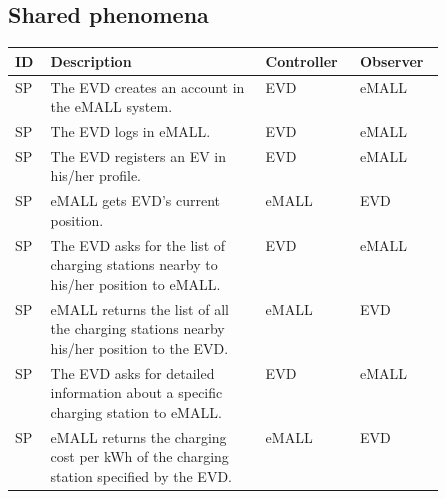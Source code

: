 \subsection{Shared phenomena}
\label{subsec:shared_phenomena}%
\setcounter{sp}{1}
\newcommand{\csp} {\thesp\stepcounter{sp}}
\begin{center}
    \begin{longtable}{ |l|p{0.5\linewidth}|l|l| }
        \hline
        \textbf{ID} & \textbf{Description}                                                                                                           & \textbf{Controller} & \textbf{Observer} \\
        \hline
        SP\csp      & The EVD creates an account in the eMALL system.\                                                                               & EVD                 & eMALL             \\
        \hline
        SP\csp      & The EVD logs in eMALL.                                                                                                         & EVD                 & eMALL             \\
        \hline
        SP\csp      & The EVD registers an EV in his/her profile.\                                                                                   & EVD                 & eMALL             \\
        \hline
        SP\csp      & eMALL gets EVD's current position.\                                                                                            & eMALL               & EVD               \\
        \hline
        SP\csp      & The EVD asks for the list of charging stations nearby to his/her position to eMALL.                                            & EVD                 & eMALL             \\
        \hline
        SP\csp      & eMALL returns the list of all the charging stations nearby his/her position to the EVD.                                        & eMALL               & EVD               \\
        \hline
        SP\csp      & The EVD asks for detailed information about a specific charging station to eMALL.                                              & EVD                 & eMALL             \\
        \hline
        SP\csp      & eMALL returns the charging cost per kWh of the charging station specified by the EVD.                                          & eMALL               & EVD               \\

\end{longtable}
\end{center}
